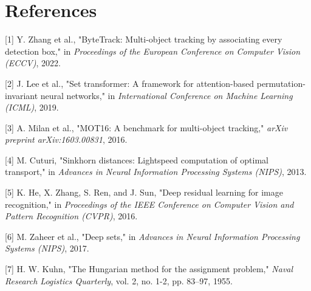 \documentclass{article}
\begin{document}
\section*{References}

\small

[1] Y. Zhang et al., "ByteTrack: Multi-object tracking by associating every detection box," in \textit{Proceedings of the European Conference on Computer Vision (ECCV)}, 2022.

[2] J. Lee et al., "Set transformer: A framework for attention-based permutation-invariant neural networks," in \textit{International Conference on Machine Learning (ICML)}, 2019.

[3] A. Milan et al., "MOT16: A benchmark for multi-object tracking," \textit{arXiv preprint arXiv:1603.00831}, 2016.

[4] M. Cuturi, "Sinkhorn distances: Lightspeed computation of optimal transport," in \textit{Advances in Neural Information Processing Systems (NIPS)}, 2013.

[5] K. He, X. Zhang, S. Ren, and J. Sun, "Deep residual learning for image recognition," in \textit{Proceedings of the IEEE Conference on Computer Vision and Pattern Recognition (CVPR)}, 2016.

[6] M. Zaheer et al., "Deep sets," in \textit{Advances in Neural Information Processing Systems (NIPS)}, 2017.

[7] H. W. Kuhn, "The Hungarian method for the assignment problem," \textit{Naval Research Logistics Quarterly}, vol. 2, no. 1-2, pp. 83–97, 1955.
\end{document}
